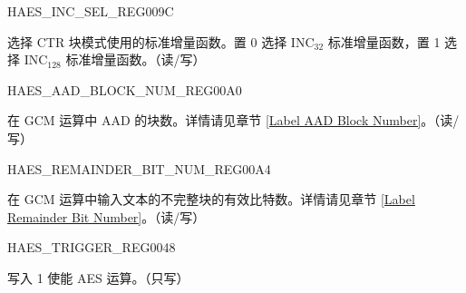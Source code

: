 \begin{register}{H}{AES\_INC\_SEL\_REG}{\hexprefix{}009C}\label{regdesc:AESINCSELREG}
%
%
\regnewline%
\begin{regdesc}\begin{reglist}
\item [AES\_INC\_SEL] 选择 CTR 块模式使用的标准增量函数。置 0 选择 INC$_{32}$ 标准增量函数，置 1 选择 INC$_{128}$ 标准增量函数。（读/写）
\end{reglist}\end{regdesc}
\end{register}


\begin{register}{H}{AES\_AAD\_BLOCK\_NUM\_REG}{\hexprefix{}00A0}\label{regdesc:AESAADBLOCKNUMREG}
%
\regnewline%
\begin{regdesc}\begin{reglist}
\item [AES\_AAD\_BLOCK\_NUM] 在 GCM 运算中 AAD 的块数。详情请见章节 \ref{Label AAD Block Number}。（读/写）
\end{reglist}\end{regdesc}
\end{register}


\begin{register}{H}{AES\_REMAINDER\_BIT\_NUM\_REG}{\hexprefix{}00A4}\label{regdesc:AESREMAINDERBITNUMREG}
%
%
\regnewline%
\begin{regdesc}\begin{reglist}
\item [AES\_REMAINDER\_BIT\_NUM] 在 GCM 运算中输入文本的不完整块的有效比特数。详情请见章节 \ref{Label Remainder Bit Number}。（读/写）
\end{reglist}\end{regdesc}
\end{register}



\begin{register}{H}{AES\_TRIGGER\_REG}{\hexprefix{}0048}\label{regdesc:AESTRIGGERREG}
%
%
\regnewline%
\begin{regdesc}\begin{reglist}
\item [AES\_TRIGGER] 写入 1 使能 AES 运算。（只写）
\end{reglist}\end{regdesc}
\end{register}


